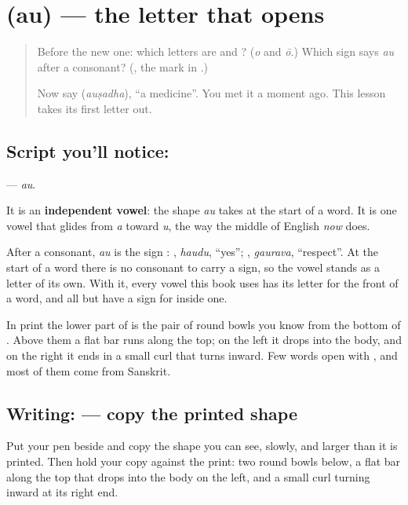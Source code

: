 \section[\texorpdfstring{\kn{ಔ} (au)}{ಔ (au)}]{ (au) — the letter that opens }

\label{lesson:KA-S175-letter-au}



\begin{quote}
Before the new one: which letters are \textbf{} and \textbf{}? (\emph{o} and \emph{ō}.) Which sign says \emph{au} after a consonant? (\textbf{}, the mark in \textbf{}.)

Now say \textbf{} (\emph{auṣadha}), \textquotedblleft{}a medicine\textquotedblright{}. You met it a moment ago. This lesson takes its first letter out.
\end{quote}

\subsection*{Script you'll notice: }
\textbf{} — \emph{au}.

It is an \textbf{independent vowel}: the shape \emph{au} takes at the start of a word. It is one vowel that glides from \emph{a} toward \emph{u}, the way the middle of English \emph{now} does.

After a consonant, \emph{au} is the sign \textbf{}: \textbf{}, \emph{haudu}, \textquotedblleft{}yes\textquotedblright{}; \textbf{}, \emph{gaurava}, \textquotedblleft{}respect\textquotedblright{}. At the start of a word there is no consonant to carry a sign, so the vowel stands as a letter of its own. With it, every vowel this book uses has its letter for the front of a word, and all but \textbf{} have a sign for inside one.

In print the lower part of \textbf{} is the pair of round bowls you know from the bottom of \textbf{}. Above them a flat bar runs along the top; on the left it drops into the body, and on the right it ends in a small curl that turns inward. Few words open with \textbf{}, and most of them come from Sanskrit.

\subsection*{Writing:  — copy the printed shape}
Put your pen beside \textbf{} and copy the shape you can see, slowly, and larger than it is printed. Then hold your copy against the print: two round bowls below, a flat bar along the top that drops into the body on the left, and a small curl turning inward at its right end.

